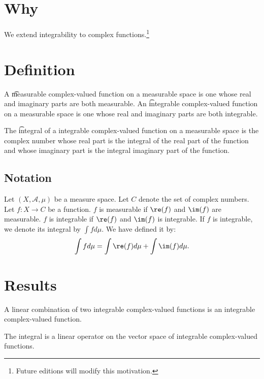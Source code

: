 
\section*{Why}

We extend integrability to complex functions.\footnote{Future editions will modify this motivation.}

\section*{Definition}

A \t{measurable} complex-valued function on a measurable space is one whose real and imaginary parts are both measurable.
An \t{integrable} complex-valued function on a measurable space is one whose real and imaginary parts are both integrable.

The \t{integral} of a integrable complex-valued function on a measurable space is the complex number whose real part is the integral of the real part of the function and whose imaginary part is the integral imaginary part of the function.

\subsection*{Notation}

Let $(X, \mathcal{A} , \mu )$
be a measure space.
Let $C$ denote the set
of complex numbers.
Let $f: X \to C$
be a function.
$f$ is measurable
if $\re(f)$ and $\im(f)$
are measurable.
$f$ is integrable if
$\re(f)$ and $\im(f)$
is integrable.
If $f$ is integrable,
we denote its integral
by $\int f d\mu $.
We have defined it by:
\[
\int  f d\mu  = \int \re(f)d\mu  + \int  \im(f) d\mu .
\]

\section*{Results}

\begin{proposition}
A linear combination
of two integrable complex-valued
functions is an integrable
complex-valued function.
\end{proposition}

\begin{proposition}
The integral is a linear
operator on the vector space
of integrable complex-valued
functions.
\end{proposition}

